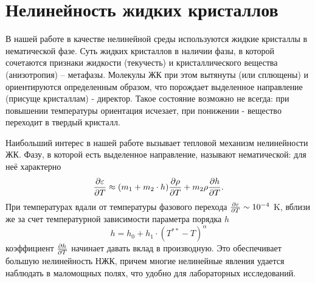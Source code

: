 \documentclass[a4paper,14pt]{extarticle}
\begin{document}


\tableofcontents
\newpage




\section{Нелинейность жидких кристаллов}
В нашей работе в качестве нелинейной среды используются жидкие кристаллы в нематической фазе. Суть жидких кристаллов в наличии фазы, в которой сочетаются признаки жидкости (текучесть) и кристаллического вещества (анизотропия) -- метафазы. Молекулы ЖК при этом вытянуты (или сплющены) и ориентируются определенным образом, что порождает выделенное направление (присуще кристаллам) - директор. Такое состояние возможно не всегда: при повышении температуры ориентация исчезает, при понижении - вещество переходит в твердый кристалл. 

Наибольший интерес в нашей работе вызывает тепловой механизм нелинейности ЖК. Фазу, в которой есть выделенное направление, называют нематической: для неё характерно 
\begin{equation}
	\pdv{\varepsilon}{T} \approx (m_1+m_2\cdot h) \pdv{\rho}{T} +m_2 \rho \pdv{h}{T}.
\end{equation}
При температурах вдали от температуры фазового перехода $\pdv{\varepsilon}{T} \sim 10^{-4}$ K, вблизи же за счет температурной зависимости параметра порядка $h$
\begin{equation}
	h = h_0 + h_1 \cdot (T^{**} - T)^\alpha
\end{equation}
коэффициент $\pdv{h}{T}$ начинает давать вклад в производную. Это обеспечивает большую нелинейность НЖК, причем многие нелинейные явления удается наблюдать в маломощных полях, что удобно для лабораторных исследований.
\end{document}
